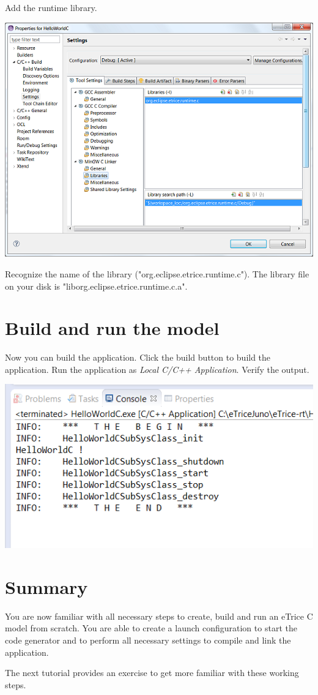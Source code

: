 Add the runtime library.

\includegraphics{images/034-HelloWorldC15.png}

Recognize the name of the library ("org.eclipse.etrice.runtime.c"). The library file on your disk is "liborg.eclipse.etrice.runtime.c.a". 

\section{Build and run the model}

Now you can build the application. Click the build button to build the application.
Run the application as \textit{Local C/C++ Application}.
Verify the output.

\includegraphics{images/034-HelloWorldC16.png}

\section{Summary}

You are now familiar with all necessary steps to create, build and run an eTrice C model from scratch. You are able to create a launch configuration to start the code generator and to perform all necessary settings to compile and link the application.  

The next tutorial provides an exercise to get more familiar with these working steps.
